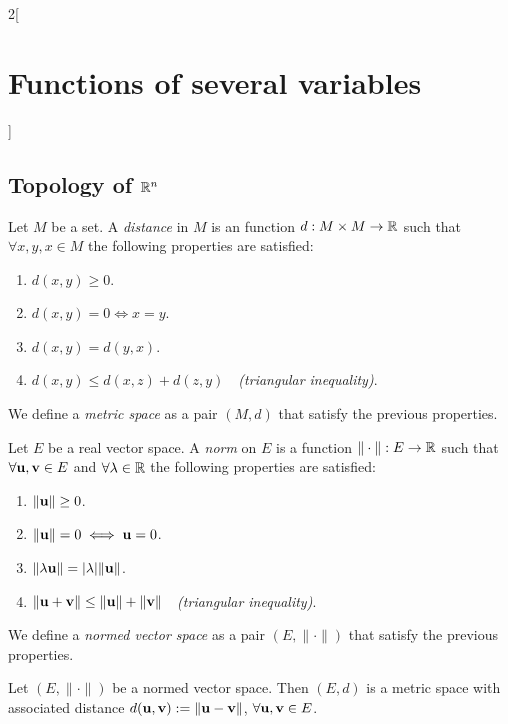 \documentclass[../../../main.tex]{subfiles}
\begin{document}
\begin{multicols}{2}[\section{Functions of several variables}]
\subsection{Topology of \texorpdfstring{$\mathbb{R}^n$}{Rn}}
\begin{definition}
Let $M$ be a set. A \textit{distance} in $M$ is an function $d:M\times M\rightarrow\mathbb{R} $ such that $\forall x,y,x\in M$ the following properties are satisfied:
\begin{enumerate}
    \item $d(x,y)\geq 0$.
    \item $d(x,y)=0\iff x=y$.
    \item $d(x,y)=d(y,x)$.
    \item $d(x,y)\leq d(x,z)+d(z,y)\quad$\textit{(triangular inequality)}.
\end{enumerate}
We define a \textit{metric space} as a pair $(M,d)$ that satisfy the previous properties.
\label{FOSV_metric}
\end{definition}
\begin{definition}\label{FOSV_norm}
Let $E$ be a real vector space. A \textit{norm} on $E$ is a function $\|\cdot\|:E\rightarrow\mathbb{R} $ such that $\forall \vb{u},\vb{v}\in E$ and $\forall\lambda\in\mathbb{R} $ the following properties are satisfied:
\begin{enumerate}
    \item $\|\vb{u}\|\geq 0$.
    \item $\|\vb{u}\|=0\iff \vb{u}=0$.
    \item $\|\lambda \vb{u}\|=|\lambda|\|\vb{u}\|$.
    \item $\|\vb{u}+\vb{v}\|\leq \|\vb{u}\|+\|\vb{v}\|\quad$\textit{(triangular inequality)}.
\end{enumerate}
We define a \textit{normed vector space} as a pair $(E,\|\cdot\|)$ that satisfy the previous properties.
\end{definition}
\begin{prop}
Let $(E,\|\cdot\|)$ be a normed vector space. Then $(E,d)$ is a metric space with associated distance $d(\vb{u},\vb{v}):=\|\vb{u}-\vb{v}\|$, $\forall \vb{u},\vb{v}\in E$.
\end{prop}

\end{multicols}
\end{document}
